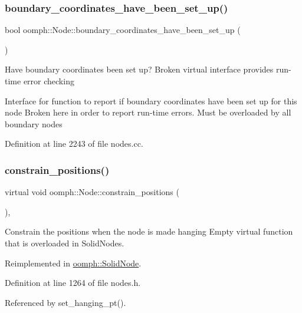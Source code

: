 \subsubsection{\texorpdfstring{boundary\+\_\+coordinates\+\_\+have\+\_\+been\+\_\+set\+\_\+up()}{boundary\_coordinates\_have\_been\_set\_up()}}
{\footnotesize\ttfamily bool oomph\+::\+Node\+::boundary\+\_\+coordinates\+\_\+have\+\_\+been\+\_\+set\+\_\+up (\begin{DoxyParamCaption}{ }\end{DoxyParamCaption})\hspace{0.3cm}{\ttfamily [virtual]}}

Have boundary coordinates been set up? Broken virtual interface provides run-\/time error checking

Interface for function to report if boundary coordinates have been set up for this node Broken here in order to report run-\/time errors. Must be overloaded by all boundary nodes 

Definition at line 2243 of file nodes.\+cc.

\mbox{\label{classoomph_1_1Node_a8758650a2e6d7312ad070bb8ce327c4b}} 
\subsubsection{\texorpdfstring{constrain\+\_\+positions()}{constrain\_positions()}}
{\footnotesize\ttfamily virtual void oomph\+::\+Node\+::constrain\+\_\+positions (\begin{DoxyParamCaption}{ }\end{DoxyParamCaption})\hspace{0.3cm}{\ttfamily [inline]}, {\ttfamily [virtual]}}



Constrain the positions when the node is made hanging Empty virtual function that is overloaded in Solid\+Nodes. 



Reimplemented in \hyperlink{classoomph_1_1SolidNode_a08b51c4154b8c399fa021d948ad36b98}{oomph\+::\+Solid\+Node}.



Definition at line 1264 of file nodes.\+h.



Referenced by set\+\_\+hanging\+\_\+pt().

